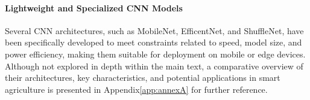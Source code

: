 







\paragraph{Lightweight and Specialized CNN Models}
Several CNN architectures, such as MobileNet, EfficentNet, and ShuffleNet, have been specifically developed to meet constraints related to speed, model size, and power efficiency, making them suitable for deployment on mobile or edge devices. Although not explored in depth within the main text, a comparative overview of their architectures, key characteristics, and potential applications in smart agriculture is presented in Appendix\ref{app:annexA} for further reference.


